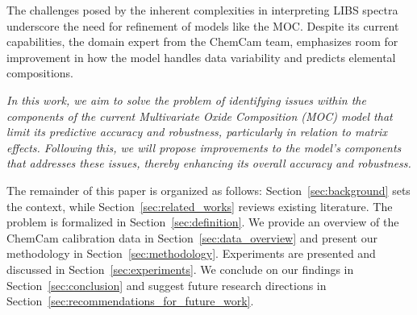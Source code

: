 The challenges posed by the inherent complexities in interpreting LIBS spectra underscore the need for refinement of models like the MOC.
Despite its current capabilities, the domain expert from the ChemCam team, emphasizes room for improvement in how the model handles data variability and predicts elemental compositions.

\textit{In this work, we aim to solve the problem of identifying issues within the components of the current Multivariate Oxide Composition (MOC) model that limit its predictive accuracy and robustness, particularly in relation to matrix effects. Following this, we will propose improvements to the model's components that addresses these issues, thereby enhancing its overall accuracy and robustness.}

The remainder of this paper is organized as follows:
Section~\ref{sec:background} sets the context, while Section~\ref{sec:related_works} reviews existing literature.
The problem is formalized in Section~\ref{sec:definition}.
We provide an overview of the ChemCam calibration data in Section~\ref{sec:data_overview} and present our methodology in Section~\ref{sec:methodology}.
Experiments are presented and discussed in Section~\ref{sec:experiments}.
We conclude on our findings in Section~\ref{sec:conclusion} and suggest future research directions in Section~\ref{sec:recommendations_for_future_work}.
